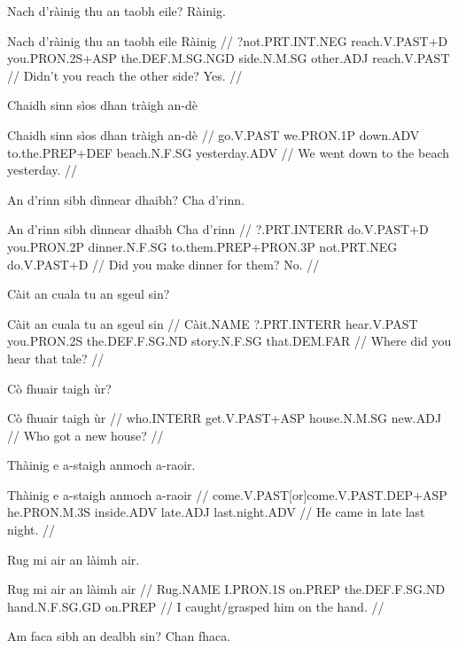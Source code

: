 \documentclass[a4paper,10pt]{article}
\begin{document}
\ex
\begingl
\glpre Nach d'ràinig thu an taobh eile? Ràinig. 

\vspace{4mm}
\gla Nach d'ràinig thu an taobh eile Ràinig  //
\glb ?not.PRT.INT.NEG reach.V.PAST+D you.PRON.2S+ASP the.DEF.M.SG.NGD side.N.M.SG other.ADJ reach.V.PAST  //
\glft Didn't you reach the other side? Yes. //
\endgl
\xe

\ex
\begingl
\glpre Chaidh sinn sìos dhan tràigh an-dè 

\vspace{4mm}
\gla Chaidh sinn sìos dhan tràigh an-dè  //
\glb go.V.PAST we.PRON.1P down.ADV to.the.PREP+DEF beach.N.F.SG yesterday.ADV  //
\glft We went down to the beach yesterday. //
\endgl
\xe

\ex
\begingl
\glpre An d'rinn sibh dìnnear dhaibh? Cha d'rinn. 

\vspace{4mm}
\gla An d'rinn sibh dìnnear dhaibh Cha d'rinn  //
\glb ?.PRT.INTERR do.V.PAST+D you.PRON.2P dinner.N.F.SG to.them.PREP+PRON.3P not.PRT.NEG do.V.PAST+D  //
\glft Did you make dinner for them? No. //
\endgl
\xe

\ex
\begingl
\glpre Càit an cuala tu an sgeul sin? 

\vspace{4mm}
\gla Càit an cuala tu an sgeul sin  //
\glb Càit.NAME ?.PRT.INTERR hear.V.PAST you.PRON.2S the.DEF.F.SG.ND story.N.F.SG that.DEM.FAR  //
\glft Where did you hear that tale? //
\endgl
\xe

\ex
\begingl
\glpre Cò fhuair taigh ùr? 

\vspace{4mm}
\gla Cò fhuair taigh ùr  //
\glb who.INTERR get.V.PAST+ASP house.N.M.SG new.ADJ  //
\glft Who got a new house? //
\endgl
\xe

\ex
\begingl
\glpre Thàinig e a-staigh anmoch a-raoir. 

\vspace{4mm}
\gla Thàinig e a-staigh anmoch a-raoir  //
\glb come.V.PAST[or]come.V.PAST.DEP+ASP he.PRON.M.3S inside.ADV late.ADJ last.night.ADV  //
\glft He came in late last night. //
\endgl
\xe

\ex
\begingl
\glpre Rug mi air an làimh air. 

\vspace{4mm}
\gla Rug mi air an làimh air  //
\glb Rug.NAME I.PRON.1S on.PREP the.DEF.F.SG.ND hand.N.F.SG.GD on.PREP  //
\glft I caught/grasped him on the hand. //
\endgl
\xe

\ex
\begingl
\glpre Am faca sibh an dealbh sin? Chan fhaca. 
\end{document}
